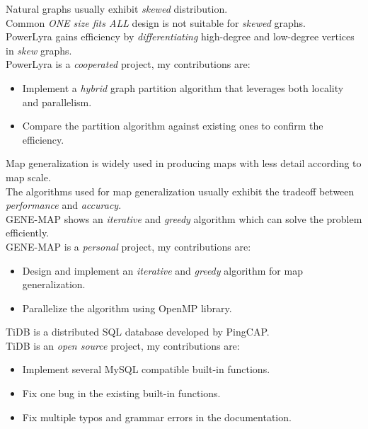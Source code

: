 \documentclass{resume}
\begin{document}
Natural graphs usually exhibit \textit{skewed} distribution.
\\[2pt]
Common \textit{ONE size fits ALL} design is not suitable for \textit{skewed} graphs.
\\[2pt]
PowerLyra gains efficiency by \textit{differentiating} high-degree and low-degree vertices in \textit{skew} graphs.
\\[2pt]
PowerLyra is a \textit{cooperated} project, my contributions are:
\begin{itemize}
  \item {Implement a \textit{hybrid} graph partition algorithm that leverages both locality and parallelism.}
  \item {Compare the partition algorithm against existing ones to confirm the efficiency.}
\end{itemize}

Map generalization is widely used in producing maps with less detail according to map scale.
\\[2pt]
The algorithms used for map generalization usually exhibit the tradeoff between \textit{performance} and \textit{accuracy}.
\\[2pt]
GENE-MAP shows an \textit{iterative} and \textit{greedy} algorithm which can solve the problem efficiently.
\\[2pt]
GENE-MAP is a \textit{personal} project, my contributions are:
\begin{itemize}
  \item {Design and implement an \textit{iterative} and \textit{greedy} algorithm for map generalization.}
  \item {Parallelize the algorithm using OpenMP library.}
\end{itemize}

TiDB is a distributed SQL database developed by PingCAP.
\\[2pt]
TiDB is an \textit{open source} project, my contributions are:
\begin{itemize}
  \item {Implement several MySQL compatible built-in functions.}
  \item {Fix one bug in the existing built-in functions.}
  \item {Fix multiple typos and grammar errors in the documentation.}
\end{itemize}
\end{document}

